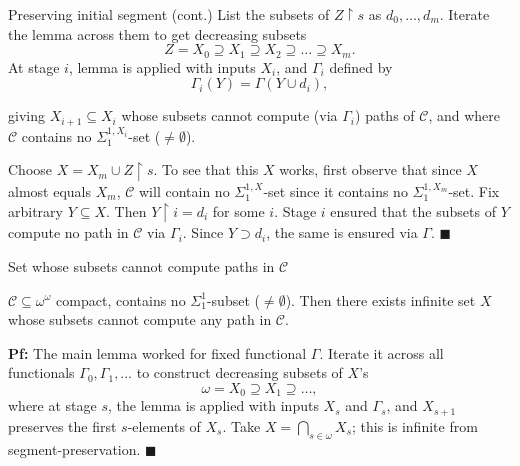 \begin{frame}{Preserving initial segment (cont.)}
  List the subsets of $Z\restriction s$ as $d_0,\ldots,d_m$. Iterate the
  lemma across them to get decreasing subsets
  \[Z=X_0 \supseteq X_1 \supseteq X_2 \supseteq\ldots \supseteq X_m.\]
  At stage $i$, lemma is applied with inputs $X_i$, and $\Gamma_i$ defined
  by
  \[\Gamma_i(Y) =\Gamma(Y\cup d_i),\]

  giving $X_{i+1}\subseteq X_i$ whose subsets cannot compute (via
  $\Gamma_i$) paths of $\mathcal{C}$, and where $\mathcal{C}$ contains no
  $\Sigma_1^{1,X_i}$-set ($\neq\emptyset$).

  \vspace{0.5em}
  Choose $X=X_m\cup Z\restriction s$. To see that this $X$ works, first
  observe that since $X$ almost equals $X_m$, $\mathcal{C}$ will
  contain no $\Sigma_1^{1,X}$-set since it contains no
  $\Sigma_1^{1,X_m}$-set. Fix arbitrary $Y\subseteq X$. Then
  $Y\restriction i=d_i$ for some $i$. Stage $i$ ensured that the subsets of
  $Y$ compute no path in $\mathcal{C}$ via $\Gamma_i$. Since $Y\supset
  d_i$, the same is ensured via $\Gamma$. $\blacksquare$
\end{frame}

\begin{frame}{Set whose subsets cannot compute paths in $\mathcal{C}$}
  \begin{main-thm*}
    $\mathcal{C}\subseteq\omega^\omega$ compact, contains no
    $\Sigma_1^1$-subset ($\neq\emptyset$). Then there exists infinite set
    $X$ whose subsets cannot compute any path in $\mathcal{C}$.
  \end{main-thm*}

  \vspace{1em}
  \textbf{Pf:} The main lemma worked for fixed functional $\Gamma$. Iterate
  it across all functionals $\Gamma_0,\Gamma_1,\ldots$ to construct decreasing
  subsets of $X$'s
  \[\omega= X_0\supseteq X_1\supseteq\ldots,\]
  where at stage $s$, the lemma is applied with inputs $X_s$ and
  $\Gamma_s$, and $X_{s+1}$ preserves the first $s$-elements of $X_s$. Take
  $X=\bigcap_{s\in\omega}X_s$; this is infinite from segment-preservation.
  $\blacksquare$
\end{frame}

